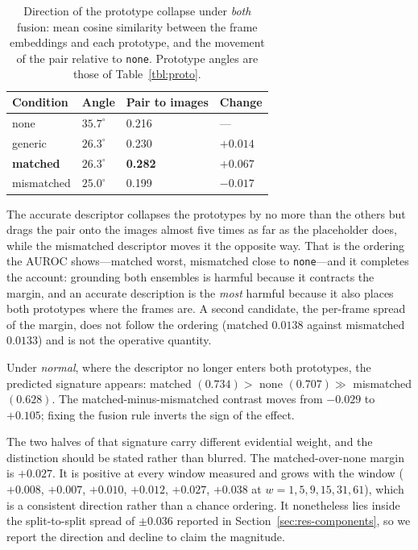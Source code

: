 \documentclass[a4paper,fleqn]{cas-sc}
\begin{document}
\begin{table}[width=\linewidth,cols=4,pos=htbp]
\caption{Direction of the prototype collapse under \emph{both} fusion: mean
cosine similarity between the frame embeddings and each prototype, and the
movement of the pair relative to \texttt{none}. Prototype angles are those of
Table~\ref{tbl:proto}.}\label{tbl:direction}
\begin{tabularx}{\linewidth}{@{}Z l l l@{}}
\toprule
\textbf{Condition} & \textbf{Angle} & \textbf{Pair to images} & \textbf{Change} \\
\midrule
none       & $35.7^\circ$ & 0.216 & --- \\
generic    & $26.3^\circ$ & 0.230 & $+0.014$ \\
\textbf{matched}    & $26.3^\circ$ & \textbf{0.282} & $\mathbf{+0.067}$ \\
mismatched & $25.0^\circ$ & 0.199 & $-0.017$ \\
\bottomrule
\end{tabularx}
\end{table}

The accurate descriptor collapses the prototypes by no more than the others but
drags the pair onto the images almost five times as far as the placeholder does,
while the mismatched descriptor moves it the opposite way. That is the ordering
the AUROC shows---matched worst, mismatched close to \texttt{none}---and it
completes the account: grounding both ensembles is harmful because it contracts
the margin, and an accurate description is the \emph{most} harmful because it
also places both prototypes where the frames are. A second candidate, the
per-frame spread of the margin, does not follow the ordering (matched $0.0138$
against mismatched $0.0133$) and is not the operative quantity.

Under \emph{normal}, where the descriptor no longer enters both prototypes, the
predicted signature appears: matched $(0.734) >$ none $(0.707) \gg$ mismatched
$(0.628)$. The matched-minus-mismatched contrast moves from $-0.029$ to
$+0.105$; fixing the fusion rule inverts the sign of the effect.

The two halves of that signature carry different evidential weight, and the
distinction should be stated rather than blurred. The matched-over-none margin
is $+0.027$. It is positive at every window measured and grows with the window
($+0.008$, $+0.007$, $+0.010$, $+0.012$, $+0.027$, $+0.038$ at $w = 1, 5, 9, 15,
31, 61$), which is a consistent direction rather than a chance ordering. It
nonetheless lies inside the split-to-split spread of $\pm 0.036$ reported in
Section~\ref{sec:res-components}, so we report the direction and decline to
claim the magnitude.
\end{document}
